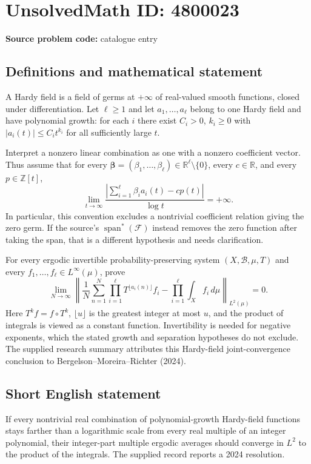 \documentclass[11pt]{article}
\begin{document}
\section*{UnsolvedMath ID: 4800023}
\textbf{Source problem code:} catalogue entry
\subsection{Definitions and mathematical statement}
A Hardy field is a field of germs at $+\infty$ of real-valued smooth functions, closed under differentiation. Let $\ell\geq1$ and let $a_1,\ldots,a_\ell$ belong to one Hardy field and have polynomial growth: for each $i$ there exist $C_i>0$, $k_i\geq0$ with $|a_i(t)|\leq C_i t^{k_i}$ for all sufficiently large $t$.

Interpret a nonzero linear combination as one with a nonzero coefficient vector. Thus assume that for every $\boldsymbol\beta=(\beta_1,\ldots,\beta_\ell)\in\mathbb R^\ell\setminus\{0\}$, every $c\in\mathbb R$, and every $p\in\mathbb Z[t]$,
\[
\lim_{t\to\infty}\frac{\left|\sum_{i=1}^\ell\beta_i a_i(t)-cp(t)\right|}{\log t}=+\infty.
\]
In particular, this convention excludes a nontrivial coefficient relation giving the zero germ. If the source's $\operatorname{span}^*(\mathcal F)$ instead removes the zero function after taking the span, that is a different hypothesis and needs clarification.

For every ergodic invertible probability-preserving system $(X,\mathcal B,\mu,T)$ and every $f_1,\ldots,f_\ell\in L^\infty(\mu)$, prove
\[
\lim_{N\to\infty}\left\|
\frac1N\sum_{n=1}^N\prod_{i=1}^\ell T^{\lfloor a_i(n)\rfloor}f_i
-\prod_{i=1}^\ell\int_X f_i\,d\mu
\right\|_{L^2(\mu)}=0.
\]
Here $T^k f=f\circ T^k$, $\lfloor u\rfloor$ is the greatest integer at most $u$, and the product of integrals is viewed as a constant function. Invertibility is needed for negative exponents, which the stated growth and separation hypotheses do not exclude. The supplied research summary attributes this Hardy-field joint-convergence conclusion to Bergelson--Moreira--Richter (2024).
\subsection{Short English statement}
If every nontrivial real combination of polynomial-growth Hardy-field functions stays farther than a logarithmic scale from every real multiple of an integer polynomial, their integer-part multiple ergodic averages should converge in $L^2$ to the product of the integrals. The supplied record reports a 2024 resolution.
\end{document}
